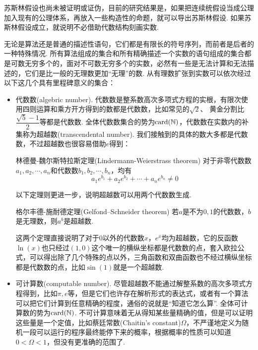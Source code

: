 苏斯林假设也尚未被证明或证伪，目前的研究结果是，如果把连续统假设当成公理加入现有的公理体系，再放入一些构造性的命题，就可以导出苏斯林假设. 如果苏斯林假设成立，就说明不必借助代数结构刻画实数.

\vspace{1cm}

无论是算法还是普通的描述性语句，它们都是有限长的符号序列，而前者是后者的一种特殊情况. 所有算法组成的集合和所有精确描述一个实数的语句组成的集合都是可数无穷多个的，面对不可数无穷多个的实数，必然有一些是无法计算和无法描述的，它们是比一般的无理数更加“无理”的数. 从有理数扩张到实数可以依次经过以下这几个具有里程碑意义的集合：
\begin{itemize}
    \item [(1)]
    代数数(algebric number). 代数数是整系数高次多项式方程的实根，有限次使用四则运算和乘方开方得到的数都是代数数，比如常见的\(\sqrt2\)、 黄金分割比\(\dfrac{\sqrt{5}-1}{2}\)等都是代数数. 全体代数数集合的势为\({\rm card}(\mathbb{N})\)，代数数在实数内的补集称为超越数(transcendental number). 我们接触到的具体的数大多都是代数数，不过超越数也很容易借助\(e\)得到：
    \begin{theorem}{林德曼-魏尔斯特拉斯定理(Lindermann-Weierstrass theorem)}
        对于非零代数数\(a_1, a_2, \cdots, a_n\)和代数数\(b_1, b_2, \cdots, b_n\)，均有
        \[a_1e^{b_1}+a_2e^{b_2}+\cdots+a_ne^{b_n} \neq 0\]
    \end{theorem}
    以下定理则更进一步，说明超越数可以用两个代数数生成.
    \begin{theorem}{格尔丰德-施耐德定理(Gelfond–Schneider theorem)}
        若\(a\)是不为\(0,1\)的代数数，\(b\)是无理数，则\(a^b\)是超越数.
    \end{theorem}
    这两个定理直接说明了对于\(0\)以外的代数数\(x\)，\(e^x\)均为超越数，它的反函数\(\ln(x)\)也只经过\((1,0)\)这个唯一的横纵坐标都是代数数的点，套入欧拉公式，可以得出除了几个特殊的点以外，三角函数和双曲函数也不经过横纵坐标都是代数数的点，比如\(\sin(1)\)就是一个超越数.
\end{itemize}
\begin{itemize}
    \item[(2)]
    可计算数(computable number). 尽管超越数不能通过解整系数的高次多项式方程得到，比如\(\pi, e\)等，但是它们也许存在解析形式的表达式，或者有一个算法可以把它们计算到任意精确的程度，通俗的说就是“知道它怎么算”. 全体可计算数的势为\({\rm card}(\mathbb{N})\). 不可计算意味着无从得知某些量精确的值，但是可以证明这些量是一个定值，比如蔡廷常数(Chaitin's constant)\(\Omega\)，不严谨地定义为随机一段可以运行的程序最终能停下来的概率，根据概率的性质可以知道\(0<\Omega<1\)，但没有更准确的范围了.
\end{itemize}
